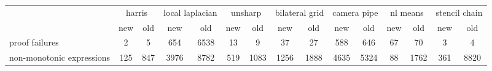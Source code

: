 ﻿%
\begin{tabular}{l|cc|cc|cc|cc|cc|cc|cc|}
& \multicolumn{2}{c|}{harris}  & \multicolumn{2}{c|}{local laplacian}  & \multicolumn{2}{c|}{unsharp}  & \multicolumn{2}{c|}{bilateral grid}  & \multicolumn{2}{c|}{camera pipe}  & \multicolumn{2}{c|}{nl means}  & \multicolumn{2}{c|}{stencil chain}  \\
& new & old & new & old & new & old & new & old & new & old & new & old & new & old\\
proof failures & 2 & 5 & 654 & 6538 & 13 & 9 & 37 & 27 & 588 & 646 & 67 & 70 & 3 & 4\\
non-monotonic expressions & 125 & 847 & 3976 & 8782 & 519 & 1083 & 1256 & 1888 & 4635 & 5324 & 88 & 1762 & 361 & 8820\\
\end{tabular}
